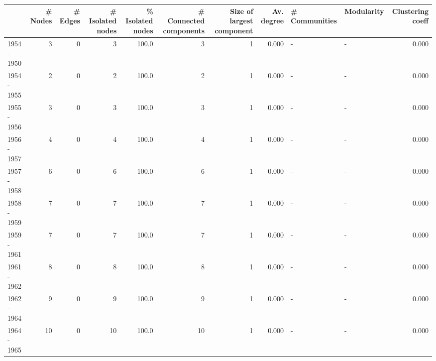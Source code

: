 \begin{tabular}{lrrrrrrrllr}
\toprule
{} &  \# Nodes &  \# Edges &  \# Isolated nodes &  \% Isolated nodes &  \# Connected components &  Size of largest component &  Av. degree & \# Communities & Modularity &  Clustering coeff \\
\midrule
1954 - 1950 &        3 &        0 &                 3 &             100.0 &                       3 &                          1 &       0.000 &             - &          - &             0.000 \\
1954 - 1955 &        2 &        0 &                 2 &             100.0 &                       2 &                          1 &       0.000 &             - &          - &             0.000 \\
1955 - 1956 &        3 &        0 &                 3 &             100.0 &                       3 &                          1 &       0.000 &             - &          - &             0.000 \\
1956 - 1957 &        4 &        0 &                 4 &             100.0 &                       4 &                          1 &       0.000 &             - &          - &             0.000 \\
1957 - 1958 &        6 &        0 &                 6 &             100.0 &                       6 &                          1 &       0.000 &             - &          - &             0.000 \\
1958 - 1959 &        7 &        0 &                 7 &             100.0 &                       7 &                          1 &       0.000 &             - &          - &             0.000 \\
1959 - 1961 &        7 &        0 &                 7 &             100.0 &                       7 &                          1 &       0.000 &             - &          - &             0.000 \\
1961 - 1962 &        8 &        0 &                 8 &             100.0 &                       8 &                          1 &       0.000 &             - &          - &             0.000 \\
1962 - 1964 &        9 &        0 &                 9 &             100.0 &                       9 &                          1 &       0.000 &             - &          - &             0.000 \\
1964 - 1965 &       10 &        0 &                10 &             100.0 &                      10 &                          1 &       0.000 &             - &          - &             0.000 \\

\end{tabular}
